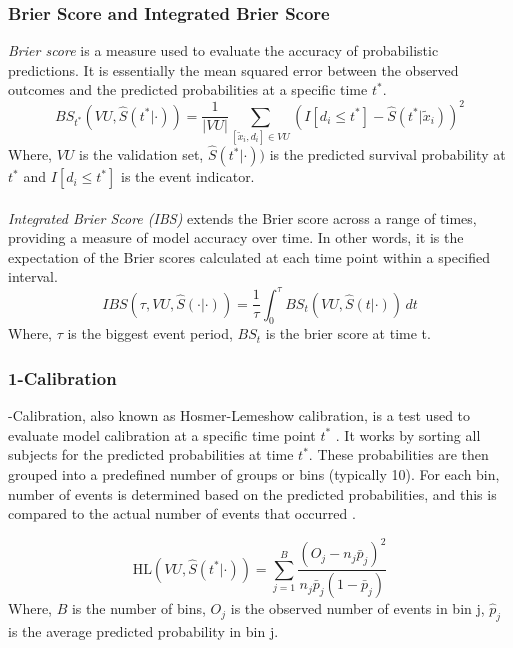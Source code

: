 \subsubsection{Brier Score and Integrated Brier Score}
\textit{Brier score} is a measure used to evaluate the accuracy of probabilistic predictions. It is essentially the mean squared error \parencite{qi_effective_2023} between the observed outcomes and the predicted probabilities at a specific time \(t^{*}\).
\begin{equation} \label{eq:bs}BS_{t^*}(VU, \hat{S}(t^* | \cdot)) = \frac{1}{|VU|} \sum_{[\tilde{x}_i, d_i] \in VU} (I[d_i \leq t^*] - \hat{S}(t^* | \tilde{x}_i))^2\end{equation}
\noindent Where, \(VU\) is the validation set, \(\hat{S}(t^* | \cdot))\) is the predicted survival probability at \(t^{*}\) and \(I[d_i \leq t^*]\) is the event indicator.
\\\\
\noindent \textit{Integrated Brier Score (IBS)} extends the Brier score across a range of times, providing a measure of model accuracy over time. In other words, it is the expectation of the Brier scores calculated at each time point within a specified interval.
\begin{equation} \label{eq:ibs}IBS(\tau, VU, \hat{S}(\cdot | \cdot)) = \frac{1}{\tau} \int_0^{\tau} BS_t(VU, \hat{S}(t | \cdot)) \, dt\end{equation}
\noindent Where, \(\tau\) is the biggest event period, \(BS_{t}\) is the brier score at time t.
\subsubsection{1-Calibration}
-Calibration, also known as Hosmer-Lemeshow calibration, is a test used to evaluate model calibration at a specific time point \(t^{*}\) \parencite{haider_effective_2018}.
It works by sorting all subjects for the predicted probabilities at time \(t^{*}\). These probabilities are then grouped into a predefined number of groups or bins (typically 10). For each bin, number of events is determined based on the predicted probabilities, and this is compared to the actual number of events that occurred \parencite{qi_effective_2023}.

\begin{equation} \label{eq:c1}\text{HL}(VU, \hat{S}(t^* | \cdot)) = \sum_{j=1}^B \frac{(O_j - n_j \bar{p}_j)^2}{n_j \bar{p}_j (1 - \bar{p}_j)}\end{equation}
\noindent Where, \(B\) is the number of bins, \(O_{j}\) is the observed number of events in bin j, \(\hat{p}_{j}\) is the average predicted probability in bin j. 


